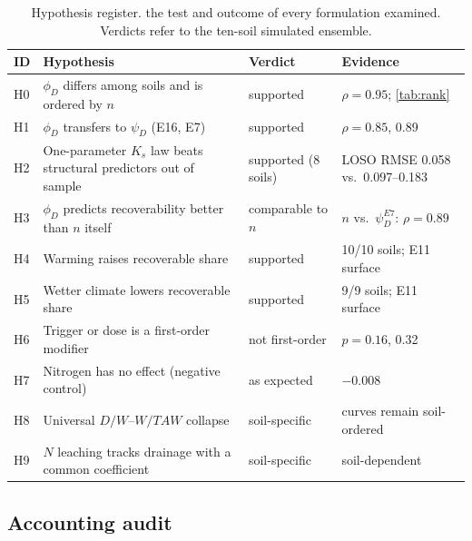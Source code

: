 \documentclass[preprint,12pt,authoryear]{elsarticle}
\newcommand{\TAW}{\mathit{TAW}}
\begin{document}
\begin{table}[H]\centering\small
\caption{Hypothesis register. the test and outcome of every formulation examined. Verdicts refer to the ten-soil simulated ensemble.}
\label{tab:hyp}
\begin{tabularx}{\textwidth}{lXlX}
\toprule
ID & Hypothesis & Verdict & Evidence\\\midrule
H0 & $\phi_D$ differs among soils and is ordered by $n$ & supported & $\rho=0.95$; \cref{tab:rank}\\
H1 & $\phi_D$ transfers to $\psi_D$ (E16, E7) & supported & $\rho=0.85$, 0.89\\
H2 & One-parameter $K_s$ law beats structural predictors out of sample & supported (8 soils) & LOSO RMSE 0.058 vs.\ 0.097--0.183\\
H3 & $\phi_D$ predicts recoverability better than $n$ itself & comparable to $n$ & $n$ vs.\ $\psi_D^{E7}$: $\rho=0.89$\\
H4 & Warming raises recoverable share & supported & 10/10 soils; E11 surface\\
H5 & Wetter climate lowers recoverable share & supported & 9/9 soils; E11 surface\\
H6 & Trigger or dose is a first-order modifier & not first-order & $p=0.16$, 0.32\\
H7 & Nitrogen has no effect (negative control) & as expected & $-0.008$\\
H8 & Universal $D/W$--$W/\TAW$ collapse & soil-specific & curves remain soil-ordered\\
H9 & $N$ leaching tracks drainage with a common coefficient & soil-specific & soil-dependent\\\bottomrule
\end{tabularx}
\end{table}

\subsection{Accounting audit}
\label{sec:resultsB}
\end{document}
